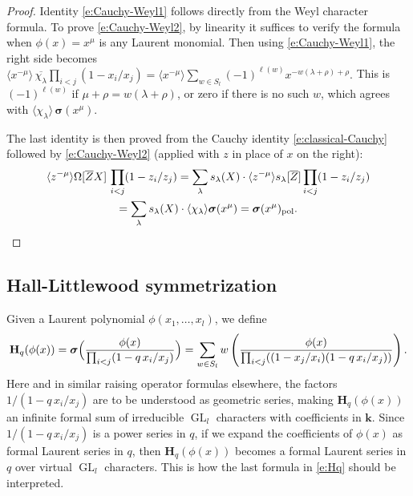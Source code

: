 \documentclass[12pt]{amsart}
\theoremstyle{definition}
\theoremstyle{remark}
\newcommand{\kk}{{\mathbf k}}
\newcommand{\Hbold}{{\mathbf H}}
\newcommand{\sigmabold}{{\boldsymbol \sigma }}
\DeclareMathOperator{\pol}{pol}
\DeclareMathOperator{\GL}{GL}
\begin{document}
\begin{proof}
Identity \eqref{e:Cauchy-Weyl1} follows directly from the Weyl
character formula.  To prove \eqref{e:Cauchy-Weyl2}, by linearity it
suffices to verify the formula when $\phi(x)= x^\mu$ is any Laurent
monomial.  Then using \eqref{e:Cauchy-Weyl1}, the right side becomes
$\langle x^{-\mu} \rangle \, \overline{ \chi _{\lambda }} \prod _{i<j}
(1-x_{i}/x_{j}) = \langle x^{-\mu} \rangle \sum _{w\in S_{l}}
(-1)^{\ell(w)}x^{-w(\lambda +\rho ) +\rho }.$ This is $(-1)^{\ell(w)}$
if $\mu+\rho =w(\lambda +\rho )$, or zero if there is no such $w$,
which agrees with $\langle \chi _{\lambda } \rangle \,
\sigmabold(x^\mu)$.

The last identity is then proved from the Cauchy identity
\eqref{e:classical-Cauchy} followed by \eqref{e:Cauchy-Weyl2} (applied
with $z$ in place of $x$ on the right):
\begin{multline}
\langle z^{-\mu } \rangle \Omega [\overline{Z}X] \, \prod
_{i<j}(1-z_{i}/z_{j}) = \sum_{\lambda}  s_\lambda(X) \cdot \langle
z^{-\mu } \rangle s_\lambda[\overline{Z}] \prod _{i<j}(1-z_{i}/z_{j})
\\
= \sum_{\lambda} s_\lambda(X) \cdot \langle \chi _{\lambda } \rangle
\sigmabold(x^\mu) = \sigmabold (x^{\mu })_{\pol }. \qed 
\end{multline}
\let\qed\relax
\end{proof}


\subsection{Hall-Littlewood symmetrization}
\label{ss:Hall-Littlewood}

Given a Laurent polynomial $\phi (x_{1},\ldots,x_{l})$, we define
\begin{equation}\label{e:Hq}
\Hbold _{q}(\phi (x)) = \sigmabold \Bigl( \frac{\phi (x)}{\prod
_{i<j}(1-q\, x_{i}/x_{j})} \Bigr) = \sum _{w\in S_{l}}
w\left(\frac{\phi (x)}{\prod _{i<j}((1-x_{j}/x_{i})(1-q\,
x_{i}/x_{j}))} \right).
\end{equation}
Here and in similar raising operator formulas elsewhere, the factors
$1/(1-q\, x_{i}/x_{j})$ are to be understood as geometric series,
making $\Hbold _{q}(\phi (x))$ an infinite formal sum of irreducible
$\GL _{l}$ characters with coefficients in $\kk $.  Since $1/(1-q\,
x_{i}/x_{j})$ is a power series in $q$, if we expand the coefficients
of $\phi (x)$ as formal Laurent series in $q$, then 
$\Hbold _{q}(\phi(x))$
becomes a formal Laurent series in $q$ over virtual $\GL_{l}$
characters.  This is how the last formula in \eqref{e:Hq} should be
interpreted.
\end{document}
